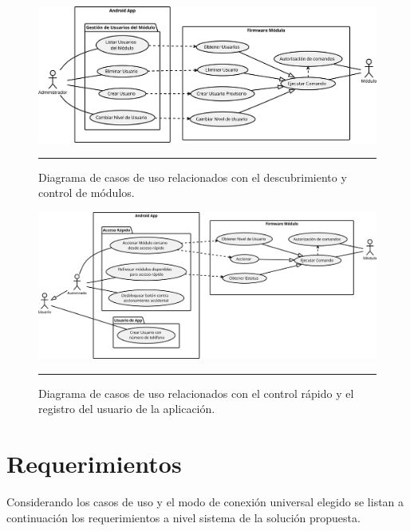 \begin{figure}[htbp]
	\centering
	\includegraphics[width=\textwidth]{Figures/reque/USE_usuarios.png}
	\rule{35em}{1pt}
	\caption[Diagrama de Casos de Uso III]{Diagrama de casos de uso relacionados con el descubrimiento y control de módulos.}
	\label{fig:uso_usuarios}
\end{figure}

\begin{figure}[htbp]
	\centering
	\includegraphics[width=\textwidth]{Figures/reque/USE_rapido.png}
	\rule{35em}{1pt}
	\caption[Diagrama de Casos de Uso IV]{Diagrama de casos de uso relacionados con el control rápido y el registro del usuario de la aplicación.}
	\label{fig:uso_rapido}
\end{figure}

\section{Requerimientos}
Considerando los casos de uso y el modo de conexión universal elegido se listan a continuación los requerimientos a nivel sistema de la solución propuesta.
